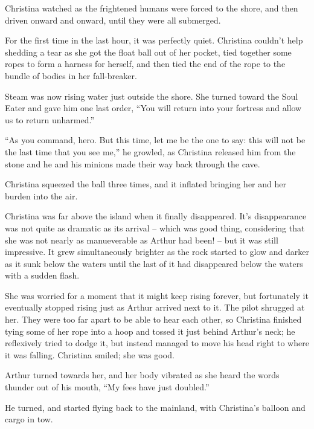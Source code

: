 \documentclass[showtrims,b6paper,draft,10pt]{memoir}
\begin{document}
Christina watched as the frightened humans were forced to the shore, and then driven onward and onward, until they were all submerged.

For the first time in the last hour, it was perfectly quiet.  Christina couldn't help shedding a tear as she got the float ball out of her pocket, tied together some ropes to form a harness for herself, and then tied the end of the rope to the bundle of bodies in her fall-breaker.

Steam was now rising water just outside the shore.  She turned toward the Soul Eater and gave him one last order, ``You will return into your fortress and allow us to return unharmed.''

``As you command, hero.  But this time, let me be the one to say:  this will not be the last time that you see me,'' he growled, as Christina released him from the stone and he and his minions made their way back through the cave.

Christina squeezed the ball three times, and it inflated bringing her and her burden into the air.

\timeskip

Christina was far above the island when it finally disappeared.  It's disappearance was not quite as dramatic as its arrival -- which was good thing, considering that she was not nearly as manueverable as Arthur had been! -- but it was still impressive.  It grew simultaneously brighter as the rock started to glow and darker as it sunk below the waters until the last of it had disappeared below the waters with a sudden flash.

She was worried for a moment that it might keep rising forever, but fortunately it eventually stopped rising just as Arthur arrived next to it.  The pilot shrugged at her.  They were too far apart to be able to hear each other, so Christina finished tying some of her rope into a hoop and tossed it just behind Arthur's neck;  he reflexively tried to dodge it, but instead managed to move his head right to where it was falling.  Christina smiled;  she was good.

Arthur turned towards her, and her body vibrated as she heard the words thunder out of his mouth, ``My fees have just doubled.''

He turned, and started flying back to the mainland, with Christina's balloon and cargo in tow.

\end{document}

